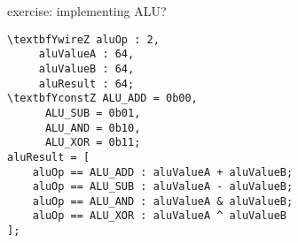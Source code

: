 \begin{frame}[fragile,label=implAlu]{exercise: implementing ALU?}
\begin{Verbatim}[fontsize=\fontsize{11}{12}\selectfont,commandchars=\\YZ]
\textbfYwireZ aluOp : 2,
     aluValueA : 64,
     aluValueB : 64,
     aluResult : 64;
\textbfYconstZ ALU_ADD = 0b00,
      ALU_SUB = 0b01,
      ALU_AND = 0b10,
      ALU_XOR = 0b11;
aluResult = [
    aluOp == ALU_ADD : aluValueA + aluValueB;
    aluOp == ALU_SUB : aluValueA - aluValueB;
    aluOp == ALU_AND : aluValueA & aluValueB;
    aluOp == ALU_XOR : aluValueA ^ aluValueB
];
\end{Verbatim}
\end{frame}
